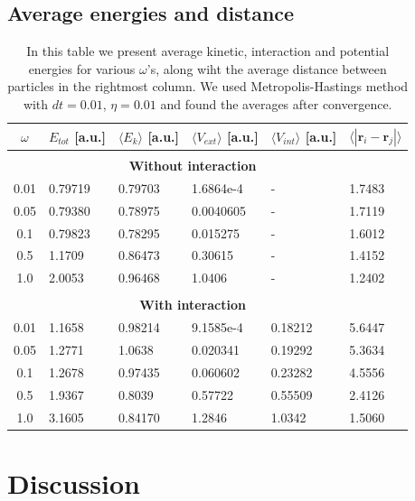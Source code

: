 \documentclass[norsk,a4paper,12pt]{article}
\begin{document}
\subsection{Average energies and distance}
\begin{table} [H]
	\caption{In this table we present average kinetic, interaction and potential energies for various $\omega$'s, along wiht the average distance between particles in the rightmost column. We used Metropolis-Hastings method with $dt=0.01$, $\eta=0.01$ and found the averages after convergence.  \vspace{2mm}}
	\begin{tabularx}{\textwidth}{c|XXXXX} \hline\hline
		\label{tab:average_energies}
		$\omega$ & $ E_{tot}$ [a.u.] & $\langle E_k\rangle$ [a.u.] & $\langle V_{ext}\rangle$ [a.u.] & $\langle V_{int}\rangle$ [a.u.] & $\langle |\boldsymbol{r}_i-\boldsymbol{r}_j|\rangle$ \\ \hline \\
				& \multicolumn{4}{c}{\textbf{Without interaction}}\\ \hline
				0.01 & 0.79719 & 0.79703 & 1.6864e-4 & - & 1.7483 \\
				0.05 & 0.79380 & 0.78975 & 0.0040605 & - & 1.7119 \\
				0.1 & 0.79823 & 0.78295 & 0.015275 & - & 1.6012 \\
				0.5 & 1.1709 & 0.86473 & 0.30615 & - & 1.4152 \\
				1.0 & 2.0053 & 0.96468 & 1.0406 & - & 1.2402 \\ \hline \\
		& \multicolumn{4}{c}{\textbf{With interaction}}\\ \hline
				0.01 & 1.1658 & 0.98214 & 9.1585e-4 & 0.18212 & 5.6447 \\
				0.05 & 1.2771 & 1.0638 & 0.020341 & 0.19292 & 5.3634 \\
				0.1 & 1.2678 & 0.97435 & 0.060602 & 0.23282 & 4.5556 \\
				0.5 & 1.9367 & 0.8039 & 0.57722 & 0.55509 & 2.4126 \\
				1.0 & 3.1605 & 0.84170 & 1.2846 & 1.0342 & 1.5060 \\ \hline
	\end{tabularx}
\end{table}


\section{Discussion} \label{sec:Discussion}
\end{document}
